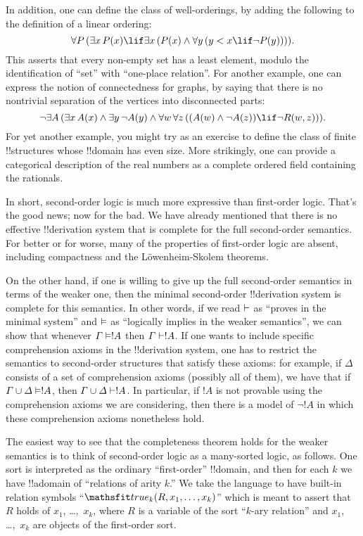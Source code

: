 \documentclass[../../../include/open-logic-section]{subfiles}
\begin{document}
In addition, one can define the class of well-orderings, by adding the
following to the definition of a linear ordering:
\[
\lforall[P][(\lexists[x][\Atom{P}{x}] \lif \lexists[x][(\Atom{P}{x}
    \land \lforall[y][(y < x \lif \lnot \Atom{P}{y})])])].
\]
This asserts that every non-empty set has a least element, modulo the
identification of ``set'' with ``one-place relation''. For another
example, one can express the notion of connectedness for graphs, by
saying that there is no nontrivial separation of the vertices into
disconnected parts:
\[
\lnot \lexists[A][(\lexists[x][A(x)] \land \lexists[y][\lnot A(y)]
  \land \lforall[w][\lforall[z][((\Atom{A}{w} \land \lnot \Atom{A}{z})
      \lif \lnot \Atom{R}{w,z})]])].
\]
For yet another example, you might try as an exercise to define the
class of finite !!{structure}s whose !!{domain} has even size. More
strikingly, one can provide a categorical description of the real
numbers as a complete ordered field containing the rationals.

In short, second-order logic is much more expressive than first-order
logic. That's the good news; now for the bad. We have already
mentioned that there is no effective !!{derivation} system that is complete for
the full second-order semantics. For better or for worse, many of the
properties of first-order logic are absent, including compactness and
the L\"owenheim-Skolem theorems.

On the other hand, if one is willing to give up the full second-order
semantics in terms of the weaker one, then the minimal second-order
!!{derivation} system is complete for this semantics. In other words, if we
read $\Proves$ as ``proves in the minimal system'' and $\Entails$ as
``logically implies in the weaker semantics'', we can show that
whenever $\Gamma \Entails !A$ then $\Gamma \Proves !A$. If one wants
to include specific comprehension axioms in the !!{derivation} system, one has
to restrict the semantics to second-order structures that satisfy
these axioms: for example, if $\Delta$ consists of a set of
comprehension axioms (possibly all of them), we have that if $\Gamma
\cup \Delta \Entails !A$, then $\Gamma \cup \Delta \Proves !A$. In
particular, if $!A$ is not provable using the comprehension axioms we
are considering, then there is a model of $\lnot !A$ in which these
comprehension axioms nonetheless hold.

The easiest way to see that the completeness theorem holds for the
weaker semantics is to think of second-order logic as a many-sorted
logic, as follows. One sort is interpreted as the ordinary
``first-order'' !!{domain}, and then for each $k$ we have !!a{domain}
of ``relations of arity $k$.'' We take the language to have built-in
relation symbols ``$\Atom{\Obj{true}_k}{R,x_1,\dots,x_k}$'' which is
meant to assert that $R$ holds of $x_1$, \dots,~$x_k$, where $R$ is a
variable of the sort ``$k$-ary relation'' and $x_1$, \dots,~$x_k$ are
objects of the first-order sort.
\end{document}
